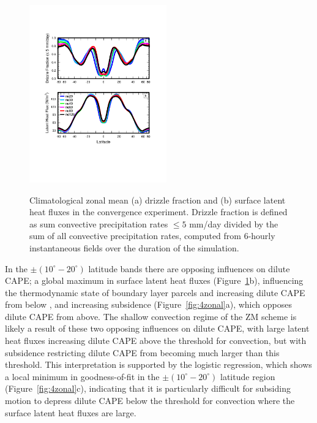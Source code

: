 \documentclass[alpha-refs]{wiley-article}
\begin{document}
\begin{figure}
\begin{center}
\noindent\includegraphics[width=14pc,angle=0]{figs/temp_2zonal.pdf}\\
\end{center}
\caption{Climatological zonal mean (a) drizzle fraction and (b) surface latent heat fluxes in the convergence experiment. Drizzle fraction is defined as sum  convective precipitation rates $\leq 5$ mm/day divided by the sum of all convective precipitation rates, computed from 6-hourly instantaneous fields over the duration of the simulation.}
\label{fig:2zonal}
\end{figure}

In the $\pm \left(10^{\circ}-20^{\circ} \right)$ latitude bands there are opposing influences on dilute CAPE; a global maximum in surface latent heat fluxes (Figure~\ref{fig:2zonal}b), influencing the thermodynamic state of boundary layer parcels and increasing dilute CAPE from below \citep{Z2002JGR}, and increasing subsidence (Figure~\ref{fig:4zonal}a), which opposes dilute CAPE from above. The shallow convection regime of the ZM scheme is likely a result of these two opposing influences on dilute CAPE, with large latent heat fluxes increasing dilute CAPE above the threshold for convection, but with subsidence restricting dilute CAPE from becoming much larger than this threshold. This interpretation is supported by the logistic regression, which shows a local minimum in goodness-of-fit in the $\pm \left(10^{\circ}-20^{\circ} \right)$ latitude region (Figure~\ref{fig:4zonal}c), indicating that it is particularly difficult for subsiding motion to depress dilute CAPE below the threshold for convection where the surface latent heat fluxes are large.
\end{document}
